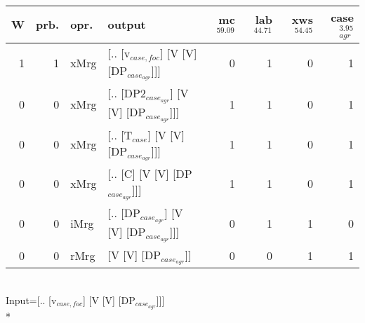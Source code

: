 \begin{tabularx}{\linewidth}{rrlXrrrr}
\hline
   W &   prb. & opr.   & output                                    &   mc$^{59.09}$ &   lab$^{44.71}$ &   xws$^{54.45}$ &   case$_{agr}^{3.95}$ \\
\hline
   1 &   1 & xMrg & [.. [v$_{case,foc}$] [V [V] [DP$_{case_{agr}}$]]]   &            0 &             1 &             0 &                  1 \\
   0 &   0 & xMrg & [.. [DP2$_{case_{agr}}$] [V [V] [DP$_{case_{agr}}$]]] &            1 &             1 &             0 &                  1 \\
   0 &   0 & xMrg & [.. [T$_{case}$] [V [V] [DP$_{case_{agr}}$]]]       &            1 &             1 &             0 &                  1 \\
   0 &   0 & xMrg & [.. [C] [V [V] [DP$_{case_{agr}}$]]]            &            1 &             1 &             0 &                  1 \\
   0 &   0 & iMrg & [.. [DP$_{case_{agr}}$] [V [V] [DP$_{case_{agr}}$]]]  &            0 &             1 &             1 &                  0 \\
   0 &   0 & rMrg & [V [V] [DP$_{case_{agr}}$]]                     &            0 &             0 &             1 &                  1 \\
\hline
\end{tabularx}\endgroup\\
\begingroup\scriptsize Input=[.. [v$_{case,foc}$] [V [V] [DP$_{case_{agr}}$]]]\\*
